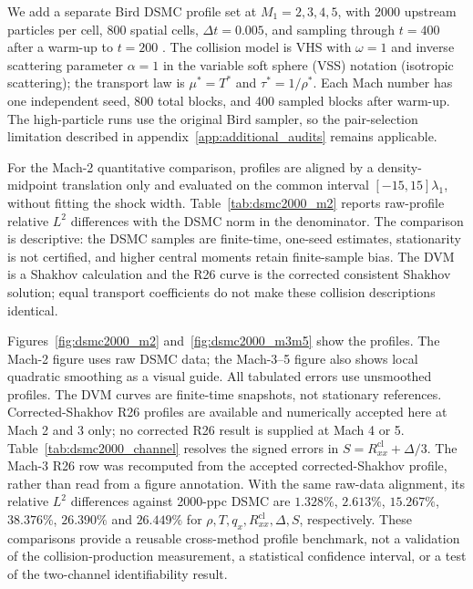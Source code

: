 \documentclass[lineno,paper]{JFM-FLM_Au}
\newenvironment{revision}{\begingroup\colorlet{shadecolor}{revisionyellow}\begin{shaded}}{\end{shaded}\endgroup}
\newenvironment{revision}{}{}
\newcommand{\cl}{\mathrm{cl}}
\begin{document}
\begin{revision}
We add a separate Bird DSMC profile set at $M_1=2,3,4,5$, with 2000 upstream particles per cell, 800 spatial cells, $\Delta t=0.005$, and sampling through $t=400$ after a warm-up to $t=200$ \citep{Bird1994}. The collision model is VHS with $\omega=1$ and inverse scattering parameter $\alpha=1$ in the variable soft sphere (VSS) notation (isotropic scattering); the transport law is $\mu^*=T^*$ and $\tau^*=1/\rho^*$. Each Mach number has one independent seed, 800 total blocks, and 400 sampled blocks after warm-up. The high-particle runs use the original Bird sampler, so the pair-selection limitation described in appendix~\ref{app:additional_audits} remains applicable.

For the Mach-2 quantitative comparison, profiles are aligned by a density-midpoint translation only and evaluated on the common interval $[-15,15]\lambda_1$, without fitting the shock width. Table~\ref{tab:dsmc2000_m2} reports raw-profile relative $L^2$ differences with the DSMC norm in the denominator. The comparison is descriptive: the DSMC samples are finite-time, one-seed estimates, stationarity is not certified, and higher central moments retain finite-sample bias. The DVM is a Shakhov calculation and the R26 curve is the corrected consistent Shakhov solution; equal transport coefficients do not make these collision descriptions identical.

Figures~\ref{fig:dsmc2000_m2} and~\ref{fig:dsmc2000_m3m5} show the profiles. The Mach-2 figure uses raw DSMC data; the Mach-3--5 figure also shows local quadratic smoothing as a visual guide. All tabulated errors use unsmoothed profiles. The DVM curves are finite-time snapshots, not stationary references. Corrected-Shakhov R26 profiles are available and numerically accepted here at Mach 2 and 3 only; no corrected R26 result is supplied at Mach 4 or 5. Table~\ref{tab:dsmc2000_channel} resolves the signed errors in $S=R^{\cl}_{xx}+\Delta/3$. The Mach-3 R26 row was recomputed from the accepted corrected-Shakhov profile, rather than read from a figure annotation. With the same raw-data alignment, its relative $L^2$ differences against 2000-ppc DSMC are $1.328\%$, $2.613\%$, $15.267\%$, $38.376\%$, $26.390\%$ and $26.449\%$ for $\rho,T,q_x,R^{\cl}_{xx},\Delta,S$, respectively. These comparisons provide a reusable cross-method profile benchmark, not a validation of the collision-production measurement, a statistical confidence interval, or a test of the two-channel identifiability result.
\end{revision}
\end{document}
